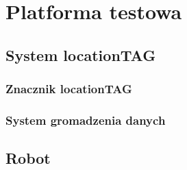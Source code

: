 \chapter{Platforma testowa}
\label{ch:platforma}

\section{System locationTAG}

\subsection{Znacznik locationTAG}

\subsection{System gromadzenia danych}


\section{Robot}
